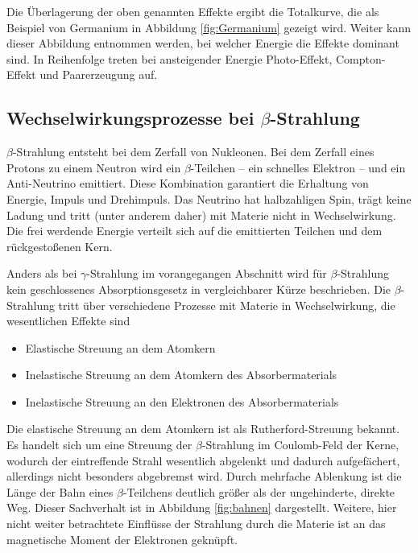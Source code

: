 Die Überlagerung der oben genannten Effekte ergibt die Totalkurve, die als Beispiel von Germanium in Abbildung \ref{fig:Germanium} gezeigt wird.
Weiter kann dieser Abbildung entnommen werden, bei welcher Energie die Effekte dominant sind.
In Reihenfolge treten bei ansteigender Energie Photo-Effekt, Compton-Effekt und Paarerzeugung auf.





\subsection{Wechselwirkungsprozesse bei \texorpdfstring{$\beta$}{Beta}-Strahlung}
\label{sec:beta}
$\beta$-Strahlung entsteht bei dem Zerfall von Nukleonen.
Bei dem Zerfall eines Protons zu einem Neutron wird ein $\beta$-Teilchen -- ein schnelles Elektron -- und ein Anti-Neutrino emittiert.
Diese Kombination garantiert die Erhaltung von Energie, Impuls und Drehimpuls.
Das Neutrino hat halbzahligen Spin, trägt keine Ladung und tritt (unter anderem daher) mit Materie nicht in Wechselwirkung.
Die frei werdende Energie verteilt sich auf die emittierten Teilchen und dem rückgestoßenen Kern.

Anders als bei $\gamma$-Strahlung im vorangegangen Abschnitt wird für  $\beta$-Strahlung kein geschlossenes Absorptionsgesetz in vergleichbarer Kürze beschrieben.
Die $\beta$-Strahlung tritt über verschiedene Prozesse mit Materie in Wechselwirkung, die wesentlichen Effekte sind
\begin{itemize}
	\item{Elastische Streuung an dem Atomkern}
	\item{Inelastische Streuung an dem Atomkern des Absorbermaterials}
	\item{Inelastische Streuung an den Elektronen des Absorbermaterials}
\end{itemize}

Die elastische Streuung an dem Atomkern ist als Rutherford-Streuung bekannt.
Es handelt sich um eine Streuung der $\beta$-Strahlung im Coulomb-Feld der Kerne, wodurch der eintreffende Strahl wesentlich abgelenkt und dadurch aufgefächert, allerdings nicht besonders abgebremst wird.
Durch mehrfache Ablenkung ist die Länge der Bahn eines $\beta$-Teilchens deutlich größer als der ungehinderte, direkte Weg.
Dieser Sachverhalt ist in Abbildung \ref{fig:bahnen} dargestellt.
Weitere, hier nicht weiter betrachtete Einflüsse der Strahlung durch die Materie ist an das magnetische Moment der Elektronen geknüpft.

